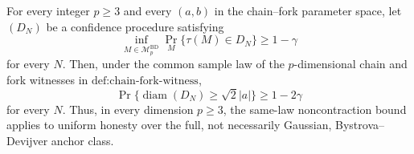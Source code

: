 For every integer \(p\ge3\) and every \((a,b)\) in the chain--fork parameter space, let \((D_N)\) be a confidence procedure satisfying
\[
 \inf_{M\in\mathcal M_p^{\mathrm{BD}}}
 \Pr_M\{\tau(M)\in D_N\}\ge 1-\gamma
\]
for every \(N\).  Then, under the common sample law of the \(p\)-dimensional chain and fork witnesses in \(\text{def:chain-fork-witness}\),
\[
 \Pr\{\operatorname{diam}(D_N)\ge\sqrt2|a|\}\ge1-2\gamma
\]
for every \(N\).  Thus, in every dimension \(p\ge3\), the same-law noncontraction bound applies to uniform honesty over the full, not necessarily Gaussian, Bystrova--Devijver anchor class.